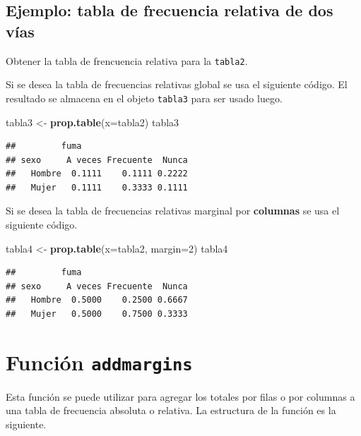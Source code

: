 \documentclass[10pt,]{krantz}
\makeatletter
\newenvironment{Shaded}{\begin{snugshade}}{\end{snugshade}}
\newcommand{\KeywordTok}[1]{\textcolor[rgb]{0.13,0.29,0.53}{\textbf{{#1}}}}
\newcommand{\DataTypeTok}[1]{\textcolor[rgb]{0.13,0.29,0.53}{{#1}}}
\newcommand{\DecValTok}[1]{\textcolor[rgb]{0.00,0.00,0.81}{{#1}}}
\newcommand{\StringTok}[1]{\textcolor[rgb]{0.31,0.60,0.02}{{#1}}}
\newcommand{\NormalTok}[1]{{#1}}
\newenvironment{kframe}{%
\medskip{}
\setlength{\fboxsep}{.8em}
 \def\at@end@of@kframe{}%
 \ifinner\ifhmode%
  \def\at@end@of@kframe{\end{minipage}}%
  \begin{minipage}{\columnwidth}%
 \fi\fi%
 \def\FrameCommand##1{\hskip\@totalleftmargin \hskip-\fboxsep
 \colorbox{shadecolor}{##1}\hskip-\fboxsep
     \hskip-\linewidth \hskip-\@totalleftmargin \hskip\columnwidth}%
 \MakeFramed {\advance\hsize-\width
   \@totalleftmargin\z@ \linewidth\hsize
   \@setminipage}}%
 {\par\unskip\endMakeFramed%
 \at@end@of@kframe}
\renewenvironment{Shaded}{\begin{kframe}}{\end{kframe}}
\makeatother
\begin{document}
\subsection*{Ejemplo: tabla de frecuencia relativa de dos
vías}\label{ejemplo-tabla-de-frecuencia-relativa-de-dos-vias}

Obtener la tabla de frencuencia relativa para la \texttt{tabla2}.

Si se desea la tabla de frecuencias relativas global se usa el siguiente
código. El resultado se almacena en el objeto \texttt{tabla3} para ser
usado luego.

\begin{Shaded}
\begin{Highlighting}[]
\NormalTok{tabla3 <-}\StringTok{ }\KeywordTok{prop.table}\NormalTok{(}\DataTypeTok{x=}\NormalTok{tabla2)}
\NormalTok{tabla3}
\end{Highlighting}
\end{Shaded}

\begin{verbatim}
##         fuma
## sexo     A veces Frecuente  Nunca
##   Hombre  0.1111    0.1111 0.2222
##   Mujer   0.1111    0.3333 0.1111
\end{verbatim}

Si se desea la tabla de frecuencias relativas marginal por
\textbf{columnas} se usa el siguiente código.

\begin{Shaded}
\begin{Highlighting}[]
\NormalTok{tabla4 <-}\StringTok{ }\KeywordTok{prop.table}\NormalTok{(}\DataTypeTok{x=}\NormalTok{tabla2, }\DataTypeTok{margin=}\DecValTok{2}\NormalTok{)}
\NormalTok{tabla4}
\end{Highlighting}
\end{Shaded}

\begin{verbatim}
##         fuma
## sexo     A veces Frecuente  Nunca
##   Hombre  0.5000    0.2500 0.6667
##   Mujer   0.5000    0.7500 0.3333
\end{verbatim}

\section{\texorpdfstring{Función \texttt{addmargins}
}{Función addmargins }}\label{funcion-addmargins}

Esta función se puede utilizar para agregar los totales por filas o por
columnas a una tabla de frecuencia absoluta o relativa. La estructura de
la función es la siguiente.
\end{document}
